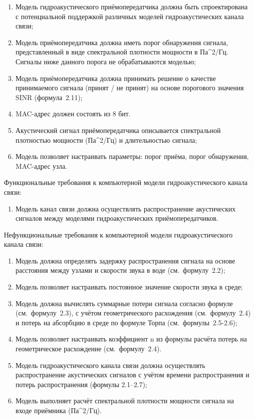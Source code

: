 \begin{enumerate}
\def\labelenumi{\arabic{enumi}.}
\item
  Модель гидроакустического приёмопередатчика должна быть спроектирована
  с потенциальной поддержкой различных моделей гидроакустических канала
  связи;
\item
  Модель приёмопередатчика должна иметь порог обнаружения сигнала,
  представленный в виде спектральной плотности мощности в Па\^{}2/Гц.
  Сигналы ниже данного порога не обрабатываются моделью;
\item
  Модель приёмопередатчика должна принимать решение о качестве
  принимаемого сигнала (принят / не принят) на основе порогового
  значения SINR (формула~2.11);
\item
  MAC-адрес должен состоять из 8 бит.
\item
  Акустический сигнал приёмопередатчика описывается спектральной
  плотностью мощности (Па\^{}2/Гц) и длительностью сигнала;
\item
  Модель позволяет настраивать параметры: порог приёма, порог
  обнаружения, MAC-адрес узла.
\end{enumerate}

Функциональные требования к компьютерной модели гидроакустического
канала связи:

\begin{enumerate}
\def\labelenumi{\arabic{enumi}.}
\item
  Модель канал связи должна осуществлять распространение акустических
  сигналов между моделями гидроакустических приёмопередатчиков.
\end{enumerate}

Нефункциональные требования к компьютерной модели гидроакустического
канала связи:

\begin{enumerate}
\def\labelenumi{\arabic{enumi}.}
\item
  Модель должна определять задержку распространения сигнала на основе
  расстояния между узлами и скорости звука в воде (см.~формулу~2.2);
\item
  Модель позволяет настраивать постоянное значение скорости звука в
  среде;
\item
  Модель должна вычислять суммарные потери сигнала согласно формуле
  (см.~формулу~2.3), с учётом геометрического расхождения
  (см.~формулу~2.4) и потерь на абсорбцию в среде по формуле Торпа
  (см.~формулы~2.5-2.6);
\item
  Модель позволяет настраивать коэффициент n из формулы расчёта потерь
  на геометрическое расхождение (см.~формулу~2.4).
\item
  Модель гидроакустического канала связи должна осуществлять
  распространение акустических сигналов с учётом времени распространения
  и потерь распространения (формулы 2.1--2.7);
\item
  Модель выполняет расчёт спектральной плотности мощности сигнала на
  входе приёмника (Па\^{}2/Гц).
\end{enumerate}

